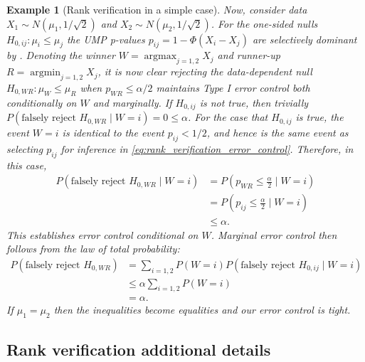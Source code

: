 \documentclass{article}
\DeclareMathOperator*{\argmin}{argmin}
\DeclareMathOperator*{\argmax}{argmax}
\newtheorem{example}{Example}
\begin{document}
\begin{appendix}
\begin{example}[Rank verification in a simple case]
    Now, consider data $X_1 \sim N(\mu_1, 1/\sqrt{2})$ and $X_2 \sim N(\mu_2, 1/\sqrt{2})$. For the one-sided nulls $H_{0, ij}: \mu_i \leq \mu_j$ the UMP p-values $p_{ij} = 1 - \Phi(X_i - X_j)$ are selectively dominant by . Denoting the winner $W = \argmax_{j = 1, 2} X_j$ and runner-up $R = \argmin_{j = 1, 2} X_j$, it is now clear rejecting the data-dependent null $H_{0, WR}: \mu_W \leq \mu_R$ when $p_{WR} \leq \alpha/2$ maintains Type I error control both conditionally on $W$ and marginally. If $H_{0, ij}$ is not true, then trivially $P(\text{falsely reject } H_{0, WR} \mid W = i) = 0 \leq \alpha$. For the case that $H_{0, ij}$ is true, the event $W=i$ is identical to the event $p_{ij} < 1/2$, and hence is the same event as selecting $p_{ij}$ for inference in \eqref{eq:rank_verification_error_control}. Therefore, in this case,
    \begin{align*}
        P(\text{falsely reject } H_{0, WR} \mid W = i) &= P\left(p_{WR} \leq \frac{\alpha}{2}  \mid W = i\right)\\
        &= P\left(p_{ij} \leq \frac{\alpha}{2}  \mid W = i \right) \\
        &\leq \alpha.
    \end{align*}
    This establishes error control conditional on $W$. Marginal error control then follows from the law of total probability:
    \begin{align*}
        P(\text{falsely reject } H_{0, WR}) &= \sum_{i=1, 2} P(W=i) P(\text{falsely reject } H_{0,ij} \mid W = i) \\
                                          &\leq \alpha \sum_{i = 1, 2} P(W=i)\\
                                          &=\alpha. 
    \end{align*}
    If $\mu_1 = \mu_2$ then the inequalities become equalities and our error control is tight. 
    \end{example}

\subsection{Rank verification additional details}
\label{sec:rank_verification_appdx}


\end{appendix}
\end{document}
